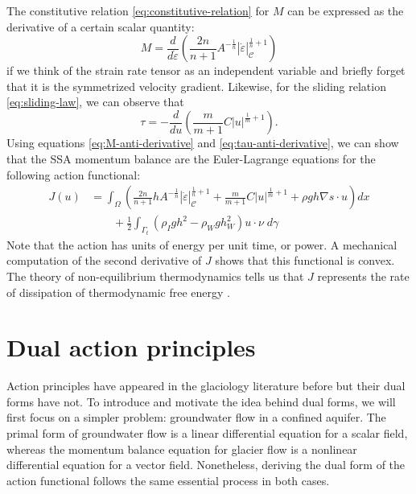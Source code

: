 \documentclass{article}
\theoremstyle{definition}
\theoremstyle{plain}
\begin{document}
The constitutive relation \eqref{eq:constitutive-relation} for $M$ can be expressed as the derivative of a certain scalar quantity:
\begin{equation}
    M = \frac{d}{d\dot\varepsilon}\left(\frac{2n}{n + 1}A^{-\frac{1}{n}}|\dot\varepsilon|_{\mathscr C}^{\frac{1}{n} + 1}\right)
    \label{eq:M-anti-derivative}
\end{equation}
if we think of the strain rate tensor as an independent variable and briefly forget that it is the symmetrized velocity gradient.
Likewise, for the sliding relation \eqref{eq:sliding-law}, we can observe that
\begin{equation}
    \tau = -\frac{d}{du}\left(\frac{m}{m + 1}C|u|^{\frac{1}{m} + 1}\right).
    \label{eq:tau-anti-derivative}
\end{equation}
Using equations \eqref{eq:M-anti-derivative} and \eqref{eq:tau-anti-derivative}, we can show that the SSA momentum balance are the Euler-Lagrange equations for the following action functional:
\begin{align}
    J(u) & = \int_\Omega\left(\frac{2n}{n + 1}hA^{-\frac{1}{n}}|\dot\varepsilon|_{\mathscr{C}}^{\frac{1}{n} + 1} + \frac{m}{m + 1}C|u|^{\frac{1}{m} + 1} + \rho gh\nabla s\cdot u\right)dx  \nonumber \\
    & \qquad + \frac{1}{2}\int_{\Gamma_t}\left(\rho_Igh^2 - \rho_Wgh_W^2\right)u\cdot\nu\; d\gamma
    \label{eq:ssa-primal-action}
\end{align}
Note that the action has units of energy per unit time, or power.
A mechanical computation of the second derivative of $J$ shows that this functional is convex.
The theory of non-equilibrium thermodynamics tells us that $J$ represents the rate of dissipation of thermodynamic free energy \citep{edelen1972nonlinear}.



\section{Dual action principles}

Action principles have appeared in the glaciology literature before but their dual forms have not.
To introduce and motivate the idea behind dual forms, we will first focus on a simpler problem: groundwater flow in a confined aquifer.
The primal form of groundwater flow is a linear differential equation for a scalar field, whereas the momentum balance equation for glacier flow is a nonlinear differential equation for a vector field.
Nonetheless, deriving the dual form of the action functional follows the same essential process in both cases.
\end{document}
